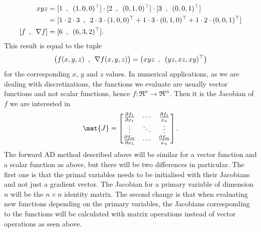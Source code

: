 \begin{align*}
    xyz &= [1\hspace{0.5em},\hspace{0.5em}(1,0,0)^\top]\cdot [2\hspace{0.5em},\hspace{0.5em}(0,1,0)^\top]\cdot
    [3\hspace{0.5em},\hspace{0.5em}(0,0,1)^\top] \\
    &=[1\cdot 2\cdot 3\hspace{0.5em},\hspace{0.5em}2\cdot3\cdot(1,0,0)^\top + 1\cdot3\cdot(0,1,0)^\top + 1\cdot2\cdot(0,0,1)^\top] \\
    [f\hspace{0.5em},\hspace{0.5em}\nabla f] &= [6\hspace{0.5em},\hspace{0.5em}(6,3,2)^\top].
\end{align*}
This result is equal to the tuple
\begin{equation*}
    \big(f(x,y,z) \hspace{0.5em},\hspace{0.5em} \nabla f(x,y,z)\big) = \big(xyz \hspace{0.5em},\hspace{0.5em} (yz,xz,xy)^\top\big)
\end{equation*}
for the corresponding $x$, $y$ and $z$ values. In numerical applications, as we are dealing with discretizations, the functions we evaluate are usually  vector functions and not scalar functions, hence $f: \Re^n \rightarrow \Re^m$. Then it is the Jacobian of $f$ we are interested in
\begin{align*}
    \mat{J}  =
    \begin{bmatrix}
        \frac{\partial f_1}{\partial x_1} & \dotsb & \frac{\partial f_1}{x_n}\\
        \vdots & \ddots & \vdots \\
        \frac{\partial f_m}{\partial x_1} & \dotsb & \frac{\partial f_m}{x_n}
    \end{bmatrix}.
\end{align*}
The forward AD method described above will be similar for a vector function and a scalar function as above, but there will be two differences in particular. The first one is that the primal variables needs to be initialised with their Jacobians and not just a gradient vector. The Jacobian for a primary variable of dimension $n$ will be the $n \times n$ identity matrix. The second change is that when evaluating new functions depending on the primary variables, the Jacobians corresponding to the functions will be calculated with matrix operations instead of vector operations as seen above. 



















